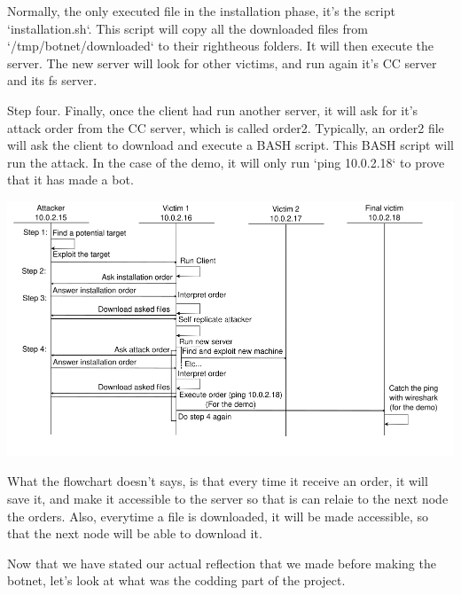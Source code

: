 \documentclass[../main.tex]{subfiles}
\begin{document}
    Normally, the only executed file in the installation phase, it's the script `installation.sh`.
    This script will copy all the downloaded files from `/tmp/botnet/downloaded` to their rightheous folders.
    It will then execute the server.
    The new server will look for other victims, and run again it's CC server and its fs server.

    Step four.
    Finally, once the client had run another server, it will ask for it's attack order from the CC server, which is called order2.
    Typically, an order2 file will ask the client to download and execute a BASH script.
    This BASH script will run the attack.
    In the case of the demo, it will only run `ping 10.0.2.18` to prove that it has made a bot.

    \includegraphics[width=450pt]{botnet_flow.png}

    What the flowchart doesn't says, is that every time it receive an order, it will save it, and make it accessible to the server so that is can relaie to the next node the orders.
    Also, everytime a file is downloaded, it will be made accessible, so that the next node will be able to download it.

    Now that we have stated our actual reflection that we made before making the botnet, let's look at what was the codding part of the project.
\end{document}
